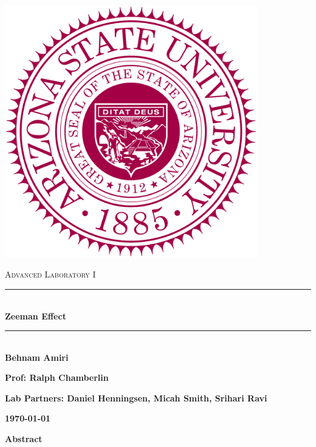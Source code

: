 \documentclass[fleqn]{article}
\begin{document}
  \begin{titlepage}

    \newcommand{\HRule}{\rule{\linewidth}{0.5mm}}

    \center

    \begin{center}
      \includegraphics[height=11cm, width=11cm]{asu.png}
    \end{center}

    \vline

    \textsc{\LARGE Advanced Laboratory I}\\[1.5cm]

    \HRule \\[0.5cm]
    { \huge \bfseries Zeeman Effect}\\[0.4cm] 
    \HRule \\[1.0cm]

    \textbf{Behnam Amiri}

    \bigbreak

    \textbf{Prof: Ralph Chamberlin}

    \bigbreak

    \textbf{Lab Partners: Daniel Henningsen, Micah Smith, Srihari Ravi}

    \bigbreak

    \textbf{{\large \today}\\[2cm]}

    \vfill

  \end{titlepage}

  \textbf{Abstract}
  \vspace{10px}
\end{document}

